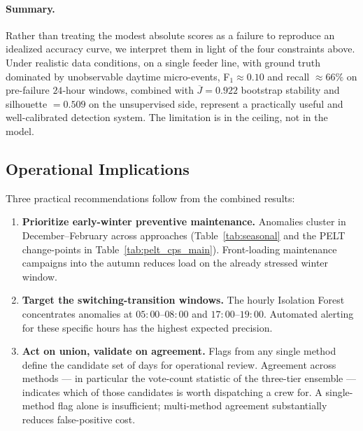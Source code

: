 \documentclass{article}
\begin{document}
\paragraph{Summary.}
Rather than treating the modest absolute scores as a failure to reproduce an idealized accuracy curve, we interpret them in light of the four constraints above. Under realistic data conditions, on a single feeder line, with ground truth dominated by unobservable daytime micro-events, F$_1 \approx 0.10$ and recall $\approx 66\%$ on pre-failure $24$-hour windows, combined with $\overline{J}=0.922$ bootstrap stability and silhouette $=0.509$ on the unsupervised side, represent a practically useful and well-calibrated detection system. The limitation is in the ceiling, not in the model.

\subsection{Operational Implications}

Three practical recommendations follow from the combined results:

\begin{enumerate}[leftmargin=1.5em,itemsep=2pt]
  \item \textbf{Prioritize early-winter preventive maintenance.} Anomalies cluster in December--February across approaches (Table~\ref{tab:seasonal} and the PELT change-points in Table~\ref{tab:pelt_cps_main}). Front-loading maintenance campaigns into the autumn reduces load on the already stressed winter window.

  \item \textbf{Target the switching-transition windows.} The hourly Isolation Forest concentrates anomalies at $05{:}00$--$08{:}00$ and $17{:}00$--$19{:}00$. Automated alerting for these specific hours has the highest expected precision.

  \item \textbf{Act on union, validate on agreement.} Flags from any single method define the candidate set of days for operational review. Agreement across methods --- in particular the vote-count statistic of the three-tier ensemble --- indicates which of those candidates is worth dispatching a crew for. A single-method flag alone is insufficient; multi-method agreement substantially reduces false-positive cost.
\end{enumerate}
\end{document}
